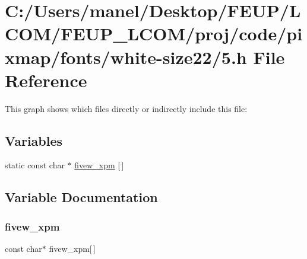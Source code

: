 \hypertarget{white-size22_25_8h}{}\section{C\+:/\+Users/manel/\+Desktop/\+F\+E\+U\+P/\+L\+C\+O\+M/\+F\+E\+U\+P\+\_\+\+L\+C\+O\+M/proj/code/pixmap/fonts/white-\/size22/5.h File Reference}
\label{white-size22_25_8h}
This graph shows which files directly or indirectly include this file\+:
\subsection*{Variables}
\begin{DoxyCompactItemize}
\item 
static const char $\ast$ \mbox{\hyperlink{white-size22_25_8h_a26fa45f9c3c12e4bd60afb22c290895d}{fivew\+\_\+xpm}} \mbox{[}$\,$\mbox{]}
\end{DoxyCompactItemize}


\subsection{Variable Documentation}
\mbox{\label{white-size22_25_8h_a26fa45f9c3c12e4bd60afb22c290895d}} 
\subsubsection{\texorpdfstring{fivew\_xpm}{fivew\_xpm}}
{\footnotesize\ttfamily const char$\ast$ fivew\+\_\+xpm\mbox{[}$\,$\mbox{]}\hspace{0.3cm}{\ttfamily [static]}}

